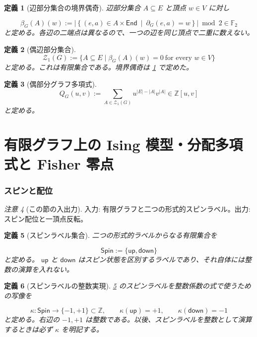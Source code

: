 \documentclass[11pt,a4paper]{article}
\newtheorem{definition}{定義}[section]
\theoremstyle{remark}
\newtheorem{remark}[definition]{注意}
\begin{document}
\begin{definition}[辺部分集合の境界偶奇]\label{lab:def_mod_two_boundary_parity}
辺部分集合 
$A\subseteq E$
 と頂点 
$w\in V$
 に対し

\[\beta_G(A)(w):=\left|\left\{(e,a)\in A\times\mathsf{End}\ \middle|\ \partial_G(e,a)=w\right\}\right|\bmod 2\in\mathbb F_2\]
と定める。各辺の二端点は異なるので、一つの辺を同じ頂点で二重に数えない。

\end{definition}

\begin{definition}[偶辺部分集合]\label{lab:def_even_edge_subset}
\[\mathcal Z_1(G):=\{A\subseteq E\mid \beta_G(A)(w)=0\ \text{for every }w\in V\}\]
と定める。これは有限集合である。境界偶奇は 
\cref{lab:def_mod_two_boundary_parity}
 で定めた。

\end{definition}

\begin{definition}[偶部分グラフ多項式]\label{lab:def_even_subgraph_polynomial}
\[Q_G(u,v):=\sum_{A\in\mathcal Z_1(G)}u^{|E|-|A|}v^{|A|}\in\mathbb Z[u,v]\]
と定める。

\end{definition}

\part{有限グラフ上の Ising 模型・分配多項式と Fisher 零点}

\section{スピンと配位}

\begin{remark}[この節の入出力]
入力: 有限グラフと二つの形式的スピンラベル。出力: スピン配位と一頂点反転。

\end{remark}

\begin{definition}[スピンラベル集合]\label{lab:def_spin_label_set}
二つの形式的ラベルからなる有限集合を

\[\mathsf{Spin}:=\{\mathsf{up},\mathsf{down}\}\]
と定める。
$\mathsf{up}$
 と 
$\mathsf{down}$
 はスピン状態を区別するラベルであり、それ自体には整数の演算を入れない。

\end{definition}

\begin{definition}[スピンラベルの整数実現]\label{lab:def_spin_integer_realization}
\cref{lab:def_spin_label_set}
 のスピンラベルを整数係数の式で使うための写像を

\[\kappa:\mathsf{Spin}\to\{-1,+1\}\subset\mathbb Z,\qquad
\kappa(\mathsf{up})=+1,\qquad \kappa(\mathsf{down})=-1\]
と定める。右辺の 
$-1,+1$
 は整数である。以後、スピンラベルを整数として演算するときは必ず 
$\kappa$
 を明記する。

\end{definition}
\end{document}
